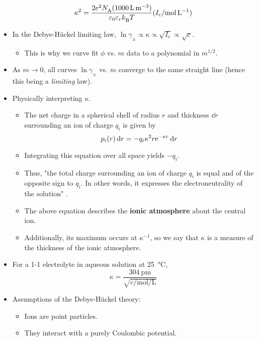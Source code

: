 \documentclass[../notes.tex]{subfiles}
\begin{document}
\begin{itemize}
\begin{equation*}
        \kappa^2 = \frac{2e^2\NA(\SI{1000}{\liter\per\cubic\meter})}{\varepsilon_0\varepsilon_r\kB T}(I_c/\si{\mole\per\liter})
    \end{equation*}
    \item In the Debye-H\"{u}ckel limiting law, $\ln\gamma_\pm\propto\kappa\propto\sqrt{I_c}\propto\sqrt{c}$.
    \begin{itemize}
        \item This is why we curve fit $\phi$ vs. $m$ data to a polynomial in $m^{1/2}$.
    \end{itemize}
    \item As $m\to 0$, all curves $\ln\gamma_\pm$ vs. $m$ converge to the same straight line (hence this being a \emph{limiting} law).
    \item Physically interpreting $\kappa$.
    \begin{itemize}
        \item The net charge in a spherical shell of radius $r$ and thickness $\dd{r}$ surrounding an ion of charge $q_i$ is given by
        \begin{equation*}
            p_i(r)\dd{r} = -q_i\kappa^2r\e[-\kappa r]\dd{r}
        \end{equation*}
        \item Integrating this equation over all space yields $-q_i$.
        \item Thus, "the total charge surrounding an ion of charge $q_i$ is equal and of the opposite sign to $q_i$. In other words, it expresses the electroneutrality of the solution" \parencite[1033-34]{bib:McQuarrieSimon}.
        \item The above equation describes the \textbf{ionic atmosphere} about the central ion.
        \item Additionally, its maximum occurs at $\kappa^{-1}$, so we say that $\kappa$ is a measure of the thickness of the ionic atmosphere.
    \end{itemize}
    \item For a 1-1 electrolyte in aqueous solution at \SI{25}{\celsius},
    \begin{equation*}
        \kappa = \frac{\SI{304}{\pico\meter}}{\sqrt{c/\si{\mole\per\liter}}}
    \end{equation*}
    \item Assumptions of the Debye-H\"{u}ckel theory:
    \begin{itemize}
        \item Ions are point particles.
        \item They interact with a purely Coulombic potential.

\end{itemize}
\end{itemize}
\end{document}
